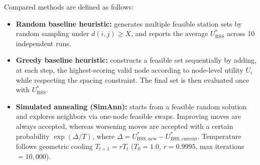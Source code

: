   Compared methods are defined as follows:
  \begin{itemize}
    \item \textbf{Random baseline heuristic:} generates multiple feasible station sets by random sampling under \(d(i,j)\ge X\), and reports the average \(U_{\mathrm{BSS}}^*\) across 10 independent runs.
    \item \textbf{Greedy baseline heuristic:} constructs a feasible set sequentially by adding, at each step, the highest-scoring valid node according to node-level utility \(U_i\) while respecting the spacing constraint. The final set is then evaluated once with \(U_{\mathrm{BSS}}^*\).
    \item \textbf{Simulated annealing (SimAnn):} starts from a feasible random solution and explores neighbors via one-node feasible swaps. Improving moves are always accepted, whereas worsening moves are accepted with a certain probability \(\exp(\Delta/T)\), where \(\Delta=U_{\mathrm{BSS,new}}^*-U_{\mathrm{BSS,current}}^*\). Temperature follows geometric cooling \(T_{t+1}=rT_t\) (\(T_0=1.0\), \(r=0.9995\), max iterations \(=10{,}000\)).
  \end{itemize}
  
